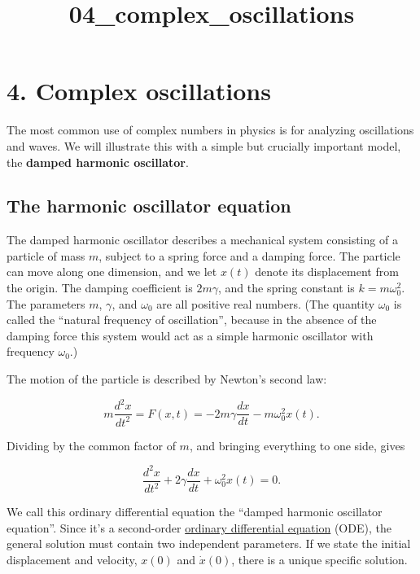 \documentclass[11pt]{article}
\title{04\_complex\_oscillations}
\begin{document}
    
    
    \maketitle
    
    

    
    \section{4. Complex oscillations}\label{complex-oscillations}

The most common use of complex numbers in physics is for analyzing
oscillations and waves. We will illustrate this with a simple but
crucially important model, the \textbf{damped harmonic oscillator}.

\subsection{The harmonic oscillator
equation}\label{the-harmonic-oscillator-equation}

The damped harmonic oscillator describes a mechanical system consisting
of a particle of mass \(m\), subject to a spring force and a damping
force. The particle can move along one dimension, and we let \(x(t)\)
denote its displacement from the origin. The damping coefficient is
\(2m \gamma\), and the spring constant is \(k = m\omega_0^2\). The
parameters \(m\), \(\gamma\), and \(\omega_0\) are all positive real
numbers. (The quantity \(\omega_0\) is called the ``natural frequency of
oscillation'', because in the absence of the damping force this system
would act as a simple harmonic oscillator with frequency \(\omega_0\).)

The motion of the particle is described by Newton's second law:

\[m \frac{d^2 x}{dt^2} = F(x,t) = - 2m\gamma \frac{dx}{dt} - m\omega_0^2 x(t).\]

Dividing by the common factor of \(m\), and bringing everything to one
side, gives

\[\frac{d^2 x}{dt^2} + 2\gamma \frac{dx}{dt} + \omega_0^2 x(t) = 0.\]

We call this ordinary differential equation the ``damped harmonic
oscillator equation''. Since it's a second-order
\href{01_derivatives.ipynb\#ODE}{ordinary differential equation} (ODE),
the general solution must contain two independent parameters. If we
state the initial displacement and velocity, \(x(0)\) and
\(\dot{x}(0)\), there is a unique specific solution.
\end{document}
